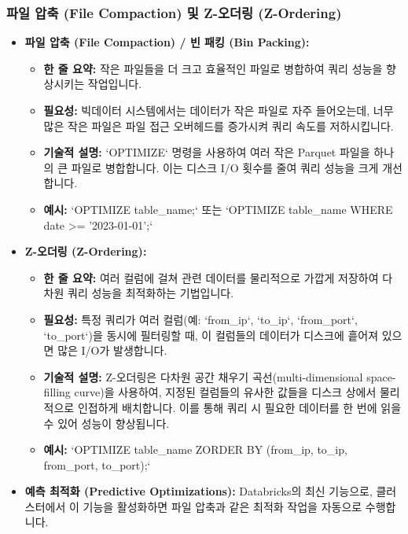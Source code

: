\documentclass[11pt,a4paper]{article}
\begin{document}
\subsubsection{파일 압축 (File Compaction) 및 Z-오더링 (Z-Ordering)}
\begin{itemize}
    \item \textbf{파일 압축 (File Compaction) / 빈 패킹 (Bin Packing):}
    \begin{itemize}
        \item \textbf{한 줄 요약:} 작은 파일들을 더 크고 효율적인 파일로 병합하여 쿼리 성능을 향상시키는 작업입니다.
        \item \textbf{필요성:} 빅데이터 시스템에서는 데이터가 작은 파일로 자주 들어오는데, 너무 많은 작은 파일은 파일 접근 오버헤드를 증가시켜 쿼리 속도를 저하시킵니다.
        \item \textbf{기술적 설명:} `OPTIMIZE` 명령을 사용하여 여러 작은 Parquet 파일을 하나의 큰 파일로 병합합니다. 이는 디스크 I/O 횟수를 줄여 쿼리 성능을 크게 개선합니다.
        \item \textbf{예시:} `OPTIMIZE table_name;` 또는 `OPTIMIZE table_name WHERE date >= '2023-01-01';`
    \end{itemize}
    \item \textbf{Z-오더링 (Z-Ordering):}
    \begin{itemize}
        \item \textbf{한 줄 요약:} 여러 컬럼에 걸쳐 관련 데이터를 물리적으로 가깝게 저장하여 다차원 쿼리 성능을 최적화하는 기법입니다.
        \item \textbf{필요성:} 특정 쿼리가 여러 컬럼(예: `from_ip`, `to_ip`, `from_port`, `to_port`)을 동시에 필터링할 때, 이 컬럼들의 데이터가 디스크에 흩어져 있으면 많은 I/O가 발생합니다.
        \item \textbf{기술적 설명:} Z-오더링은 다차원 공간 채우기 곡선(multi-dimensional space-filling curve)을 사용하여, 지정된 컬럼들의 유사한 값들을 디스크 상에서 물리적으로 인접하게 배치합니다. 이를 통해 쿼리 시 필요한 데이터를 한 번에 읽을 수 있어 성능이 향상됩니다.
        \item \textbf{예시:} `OPTIMIZE table_name ZORDER BY (from_ip, to_ip, from_port, to_port);`
    \end{itemize}
    \item \textbf{예측 최적화 (Predictive Optimizations):} Databricks의 최신 기능으로, 클러스터에서 이 기능을 활성화하면 파일 압축과 같은 최적화 작업을 자동으로 수행합니다.
\end{itemize}
\end{document}
